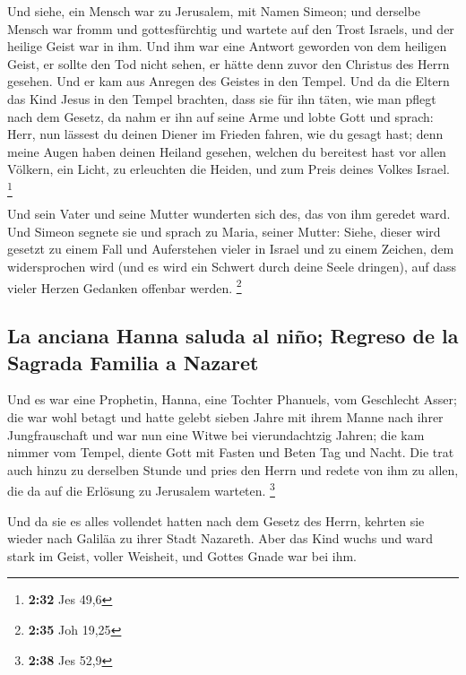  Und siehe, ein Mensch war zu Jerusalem, mit Namen
Simeon; und derselbe Mensch war fromm und gottesfürchtig und wartete auf
den Trost Israels, und der heilige Geist war in ihm.  Und
ihm war eine Antwort geworden von dem heiligen Geist, er sollte den Tod
nicht sehen, er hätte denn zuvor den Christus des Herrn gesehen.
 Und er kam aus Anregen des Geistes in den Tempel. Und da
die Eltern das Kind Jesus in den Tempel brachten, dass sie für ihn
täten, wie man pflegt nach dem Gesetz,  da nahm er ihn
auf seine Arme und lobte Gott und sprach:  Herr, nun
lässest du deinen Diener im Frieden fahren, wie du gesagt hast;
 denn meine Augen haben deinen Heiland gesehen,
 welchen du bereitest hast vor allen Völkern,
 ein Licht, zu erleuchten die Heiden, und zum Preis
deines Volkes Israel. \footnote{\textbf{2:32} Jes 49,6}

 Und sein Vater und seine Mutter wunderten sich des, das
von ihm geredet ward.  Und Simeon segnete sie und sprach
zu Maria, seiner Mutter: Siehe, dieser wird gesetzt zu einem Fall und
Auferstehen vieler in Israel und zu einem Zeichen, dem widersprochen
wird  (und es wird ein Schwert durch deine Seele
dringen), auf dass vieler Herzen Gedanken offenbar werden. \footnote{\textbf{2:35}
  Joh 19,25}

\hypertarget{la-anciana-hanna-saluda-al-niuxf1o-regreso-de-la-sagrada-familia-a-nazaret}{%
\subsection{La anciana Hanna saluda al niño; Regreso de la Sagrada
Familia a
Nazaret}\label{la-anciana-hanna-saluda-al-niuxf1o-regreso-de-la-sagrada-familia-a-nazaret}}

 Und es war eine Prophetin, Hanna, eine Tochter Phanuels,
vom Geschlecht Asser; die war wohl betagt und hatte gelebt sieben Jahre
mit ihrem Manne nach ihrer Jungfrauschaft  und war nun
eine Witwe bei vierundachtzig Jahren; die kam nimmer vom Tempel, diente
Gott mit Fasten und Beten Tag und Nacht.  Die trat auch
hinzu zu derselben Stunde und pries den Herrn und redete von ihm zu
allen, die da auf die Erlösung zu Jerusalem warteten. \footnote{\textbf{2:38}
  Jes 52,9}

 Und da sie es alles vollendet hatten nach dem Gesetz des
Herrn, kehrten sie wieder nach Galiläa zu ihrer Stadt Nazareth.
 Aber das Kind wuchs und ward stark im Geist, voller
Weisheit, und Gottes Gnade war bei ihm.

